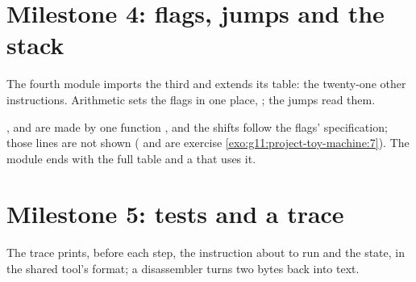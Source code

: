 \section{Milestone 4: flags, jumps and the stack}\label{sec:g11:project-toy-machine:m4}

The fourth module imports the third and extends its table: the twenty-one other instructions. Arithmetic sets the
flags in one place, ; the jumps read them.

\label{lst:g11:project-toy-machine:m4-arith}

\label{lst:g11:project-toy-machine:m4-jumps}

\label{lst:g11:project-toy-machine:m4-stack}

,  and  are made by one function , and the shifts follow the flags'
specification; those lines are not shown ( and  are exercise
\ref{exo:g11:project-toy-machine:7}). The module ends with the full table and a  that uses it.

\label{lst:g11:project-toy-machine:m4-table}

%
\label{out:g11:project-toy-machine:m4}

\section{Milestone 5: tests and a trace}\label{sec:g11:project-toy-machine:m5}

The trace prints, before each step, the instruction about to run and the state, in the shared tool's format; a
disassembler turns two bytes back into text.

